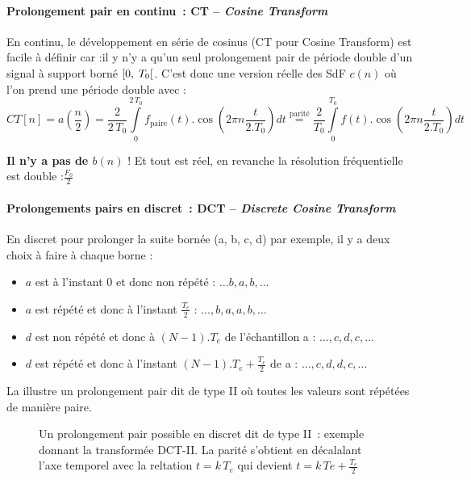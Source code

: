 \paragraph{Prolongement pair en continu~: CT -- \emph{Cosine Transform}}
En continu, le développement en série de cosinus (CT pour Cosine
Transform) est facile à définir car :il y n'y a qu'un seul
prolongement pair de période double d'un signal à support borné
$\ST0$. C'est donc une version réelle des SdF $c(n)$ où l'on prend une
période double avec :
$$CT[n] = a(\frac{n}{2}) = \frac{2}{2\,T_0}\int\limits_0^{2\,T_0} f_{\text{paire}}(t) . \cos\left(2\pi n \frac{t}{2.T_0}\right) dt \overset{\text{parité}}{=} \frac{2}{T_0}\int\limits_0^{T_0} f(t) . \cos\left(2\pi n \frac{t}{2.T_0}\right) dt$$

\textbf{Il n'y a pas de $b(n)$} ! Et tout est réel, en revanche la
résolution fréquentielle est double :$\frac{F_0}{2}$

\paragraph{Prolongements pairs en discret~: DCT -- \emph{Discrete
    Cosine Transform}}

En discret pour prolonger la suite bornée (a, b, c, d) par exemple, il
y a deux choix à faire à chaque borne :
\begin{itemize}
\item $a$ est à l'instant 0 et donc non répété :
  $\ldots b,a,b,\ldots{}$
\item $a$ est répété et donc à l'instant $\frac{T_e}{2}$ :
  $\ldots, b, a, a, b, \dots$
\item $d$ est non répété et donc à $(N-1).T_e$ de l'échantillon a :
  $\ldots, c, d, c, \dots$
\item $d$ est répété et donc à l'instant $(N-1).T_e + \frac{T_e}{2}$
  de a : $\ldots, c, d, d, c, \dots$
\end{itemize}

La  illustre un prolongement pair dit de type II où
toutes les valeurs sont répétées de manière paire.
\begin{figure}[htbp]
  \centering {}
  \caption{Un prolongement pair possible en discret dit de type II~:
    exemple donnant la transformée DCT-II. La parité s'obtient en
    décalalant l'axe temporel avec la reltation $t=k\,T_e$ qui devient
    $t=k\,Te + \frac{T_e}{2}$ }
  \label{fig:DCT_II}
\end{figure}


